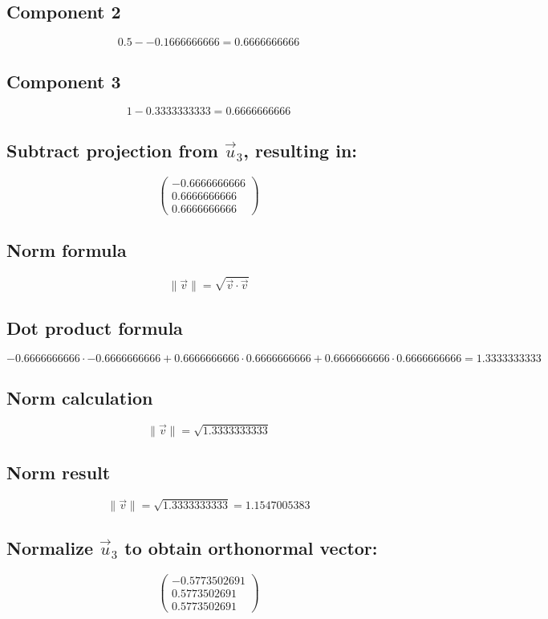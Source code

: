 \documentclass{article}
\begin{document}
\subsection*{ \vspace{1em} Component 2}
\[
0.5 - -0.1666666666 = 0.6666666666
\]
\subsection*{ \vspace{1em} Component 3}
\[
1 - 0.3333333333 = 0.6666666666
\]
\subsection*{ \vspace{1em} Subtract projection from \(\vec{u}_{3}\), resulting in:}
\[
\begin{pmatrix}-0.6666666666 \\ 0.6666666666 \\ 0.6666666666\end{pmatrix}
\]
\subsection*{ \vspace{1em} Norm formula}
\[
\|\vec{v}\| = \sqrt{\vec{v} \cdot \vec{v}}
\]
\subsection*{ \vspace{1em} Dot product formula}
\[
-0.6666666666 \cdot -0.6666666666 + 0.6666666666 \cdot 0.6666666666 + 0.6666666666 \cdot 0.6666666666 = 1.3333333333
\]
\subsection*{ \vspace{1em} Norm calculation}
\[
\|\vec{v}\| = \sqrt{1.3333333333}
\]
\subsection*{ \vspace{1em} Norm result}
\[
\|\vec{v}\| = \sqrt{1.3333333333} = 1.1547005383
\]
\subsection*{ \vspace{1em} Normalize \(\vec{u}_{3}\) to obtain orthonormal vector:}
\[
\begin{pmatrix}-0.5773502691 \\ 0.5773502691 \\ 0.5773502691\end{pmatrix}
\]
\medskip
\end{document}
